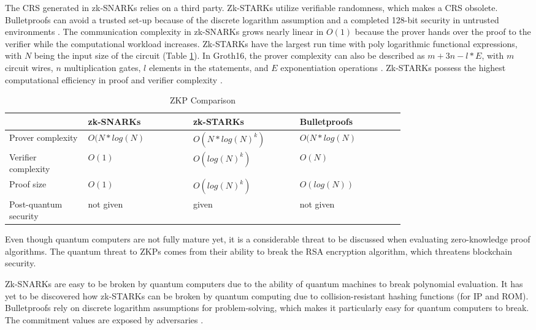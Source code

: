 The CRS generated in zk-SNARKs relies on a third party. Zk-STARKs utilize verifiable randomness, which makes a CRS obsolete. Bulletproofs can avoid a trusted set-up because of the discrete logarithm assumption and a completed 128-bit security in untrusted environments \citep{Huangetal}. The communication complexity in zk-SNARKs grows nearly linear in \(O(1)\) because the prover hands over the proof to the verifier while the computational workload increases. Zk-STARKs have the largest run time with poly logarithmic functional expressions, with \(N\) being the input size of the circuit (Table \ref{tab:complexity}). In Groth16, the prover complexity can also be described as \(m + 3n - l*E\), with \(m\) circuit wires, \(n\) multiplication gates, \(l\) elements in the statements, and \(E\) exponentiation operations \citep{Groth2016OnTS}. Zk-STARKs possess the highest computational efficiency in proof and verifier complexity \citep{gongetal}.
\setlength{\tabcolsep}{2ex}
\renewcommand{\arraystretch}{1.5}%
\begin{table}[ht]
	\centering
	    \caption{ZKP Comparison}
		\begin{tabular}{| m{0.15\linewidth} | m{0.2\linewidth} |              m{0.2\linewidth}      | m{0.2\linewidth}|} \hline
		\textbf{} & \textbf{zk-SNARKs} & \textbf{zk-STARKs} &\textbf{Bulletproofs}       \\ \hline
            Prover \newline complexity & \(O(N*log(N)\) & \(O(N*log(N)^k)\) & \(O(N*log(N)\) \\  \hline
            Verifier \newline complexity & \(O(1)\) & \(O(log(N)^k)\) & \(O(N)\) \\ \hline 
            Proof size & \(O(1)\) & \(O(log(N)^k)\) &  \(O(log(N))\)\\  \hline
            Post-quantum security &  not given & given & not given\\  \hline 
	\end{tabular}
\label{tab:complexity}
\end{table}

Even though quantum computers are not fully mature yet, it is a considerable threat to be discussed when evaluating zero-knowledge proof algorithms. The quantum threat to ZKPs comes from their ability to break the RSA encryption algorithm, which threatens blockchain security.

Zk-SNARKs are easy to be broken by quantum computers due to the ability of quantum machines to break polynomial evaluation. It has yet to be discovered how zk-STARKs can be broken by quantum computing due to collision-resistant hashing functions (for IP and ROM). Bulletproofs rely on discrete logarithm assumptions for problem-solving, which makes it particularly easy for quantum computers to break. The commitment values are exposed by adversaries \citep{gongetal}. 

